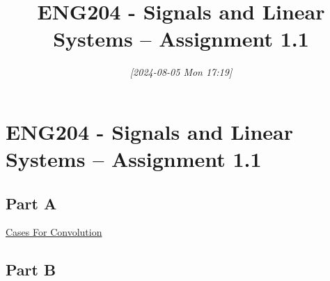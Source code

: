 \documentclass[11pt]{article}
\date{\textit{{[}2024-08-05 Mon 17:19]}}
\title{ENG204 - Signals and Linear Systems – Assignment 1.1}
\begin{document}
\maketitle
\tableofcontents

\section{ENG204 - Signals and Linear Systems – Assignment 1.1}
\label{sec:orgeb1f4d3}
\subsection{Part A}
\label{sec:orgb7dad94}
\href{file:///home/Baley/UTAS/ENG204 - Signals And Linear Systems/Assignment 1.1/2024-08-07-Note-10-27.xopp}{Cases For Convolution}
\subsection{Part B}
\label{sec:orga6fd480}
\end{document}
